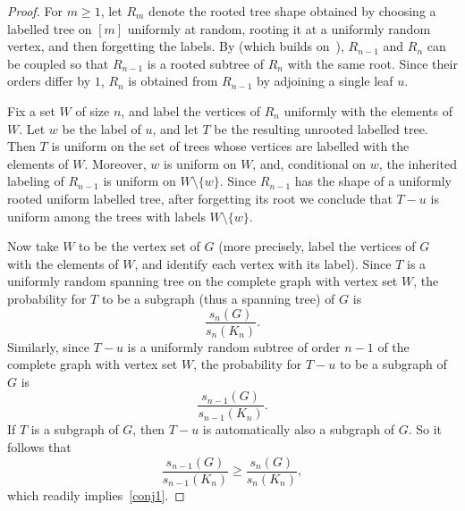 \documentclass[11pt]{article}
\theoremstyle{definition}
\newcommand{\cD}{\mathcal D}
\newcommand{\cA}{\mathcal A}
\newcommand{\cT}{\mathcal T}
\begin{document}
\begin{proof}
For $m\geq1$, let $R_m$ denote the rooted tree shape obtained by
choosing a labelled tree on $[m]$ uniformly at random, rooting it at a uniformly random vertex,
and then forgetting the labels.  By
\cite[Theorem~2.1]{LyonsPeledSchramm} (which builds on~\cite{LuczakWinkler}), $R_{n-1}$ and $R_n$ can be
coupled so that $R_{n-1}$ is a rooted subtree of $R_n$ with the same root.  Since their
orders differ by $1$, $R_n$ is obtained from $R_{n-1}$ by adjoining a
single leaf $u$.

Fix a set $W$ of size $n$, and label the vertices of $R_n$ uniformly with the elements of $W$.  Let
$w$ be the label of $u$, and let $T$ be the resulting unrooted labelled
tree.  Then $T$ is uniform on the set of trees whose vertices are labelled with the elements of $W$.  Moreover, $w$ is uniform on
$W$, and, conditional on $w$, the inherited labeling of $R_{n-1}$ is
uniform on $W\setminus\{w\}$.  Since $R_{n-1}$ has the shape of a
uniformly rooted uniform labelled tree, after forgetting its root we
conclude that $T-u$ is uniform among the trees with labels
$W\setminus\{w\}$.  

Now take $W$ to be the vertex set of $G$ (more precisely, label the vertices of $G$ with the elements of $W$, and identify each vertex with its label). Since $T$ is a uniformly random spanning tree on the complete graph with vertex set $W$, the probability for $T$ to be a subgraph (thus a spanning tree) of $G$ is
$$\frac{s_n(G)}{s_n(K_n)}.$$
Similarly, since $T-u$ is a uniformly random subtree of order $n-1$ of the complete graph with vertex set $W$, the probability for $T - u$ to be a subgraph of $G$ is
$$\frac{s_{n-1}(G)}{s_{n-1}(K_n)}.$$
If $T$ is a subgraph of $G$, then $T-u$ is automatically also a subgraph of $G$. So it follows that
$$\frac{s_{n-1}(G)}{s_{n-1}(K_n)} \geq \frac{s_n(G)}{s_n(K_n)},$$
which readily implies~\cref{conj1}.
\end{proof}




\end{document}
